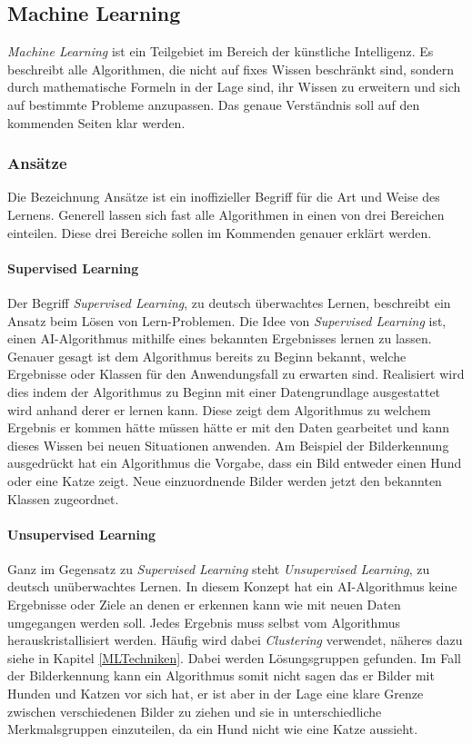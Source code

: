\subsection{Machine Learning}

\textit{Machine Learning} ist ein Teilgebiet im Bereich der künstliche Intelligenz. Es beschreibt alle Algorithmen, die nicht auf fixes Wissen beschränkt sind, sondern durch mathematische Formeln in der Lage sind, ihr Wissen zu erweitern und sich auf bestimmte Probleme anzupassen. Das genaue Verständnis soll auf den kommenden Seiten klar werden.

\subsubsection{Ansätze}
\label{machinelearning_ansaetze}

Die Bezeichnung Ansätze ist ein inoffizieller Begriff für die Art und Weise des Lernens. Generell lassen sich fast alle Algorithmen in einen von drei Bereichen einteilen. Diese drei Bereiche sollen im Kommenden genauer erklärt werden.

\paragraph{Supervised Learning}
Der Begriff \textit{Supervised Learning}, zu deutsch überwachtes Lernen, beschreibt ein Ansatz beim Lösen von Lern-Problemen. Die Idee von \textit{Supervised Learning} ist, einen AI-Algorithmus mithilfe eines bekannten Ergebnisses lernen zu lassen. Genauer gesagt ist dem Algorithmus bereits zu Beginn bekannt, welche Ergebnisse oder Klassen für den Anwendungsfall zu erwarten sind. Realisiert wird dies indem der Algorithmus zu Beginn mit einer Datengrundlage ausgestattet wird anhand derer er lernen kann. Diese zeigt dem Algorithmus zu welchem Ergebnis er kommen hätte müssen hätte er mit den Daten gearbeitet und kann dieses Wissen bei neuen Situationen anwenden. Am Beispiel der Bilderkennung ausgedrückt hat ein Algorithmus die Vorgabe, dass ein Bild entweder einen Hund oder eine Katze zeigt. Neue einzuordnende Bilder werden jetzt den bekannten Klassen zugeordnet.\cite{M_DL4J_Many}

\paragraph{Unsupervised Learning}
Ganz im Gegensatz zu \textit{Supervised Learning} steht \textit{Unsupervised Learning}, zu deutsch unüberwachtes Lernen. In diesem Konzept hat ein AI-Algorithmus keine Ergebnisse oder Ziele an denen er erkennen kann wie mit neuen Daten umgegangen werden soll. Jedes Ergebnis muss selbst vom Algorithmus herauskristallisiert werden. Häufig wird dabei \textit{Clustering} verwendet, näheres dazu siehe in Kapitel \ref{MLTechniken}. Dabei werden Lösungsgruppen gefunden. Im Fall der Bilderkennung kann ein Algorithmus somit nicht sagen das er Bilder mit Hunden und Katzen vor sich hat, er ist aber in der Lage eine klare Grenze zwischen verschiedenen Bilder zu ziehen und sie in unterschiedliche Merkmalsgruppen einzuteilen, da ein Hund nicht wie eine Katze aussieht.\cite{M_DL4J_Many}


